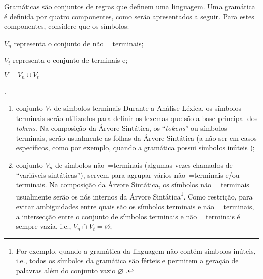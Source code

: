 Gramáticas são conjuntos de regras que definem uma linguagem.
Uma gramática é definida por quatro componentes,
como serão apresentados a seguir.
Para estes componentes,
considere que os símbolos:
\begin{inparaenum}[1)]
\item $V_n$ representa o conjunto de não~=terminais;
\item $V_t$ representa o conjunto de terminais e;
\item $V = V_n \cup V_t$
\end{inparaenum}.
\begin{enumerate}%
    \item {} conjunto $V_t$ de símbolos terminais%
    Durante a Análise Léxica,
    os símbolos terminais serão utilizados para definir os lexemas que são a base principal dos \textit{tokens}.
    Na composição da Árvore Sintática,
    os ``\textit{tokens}'' ou símbolos terminais,
    serão usualmente as folhas da Árvore Sintática (a não ser em casos específicos,
    como por exemplo,
    quando a gramática possui símbolos inúteis \cite{hopcroftBook});

    \item {} conjunto $V_n$ de símbolos não~=terminais (algumas vezes chamados de ``variáveis sintáticas''),
    servem para agrupar vários não~=terminais e\slash{}ou terminais.
    Na composição da Árvore Sintática,
    os símbolos não~=terminais usualmente serão os nós internos da Árvore Sintática\footnote{
    Por exemplo,
    quando a gramática da linguagem não contém símbolos inúteis,
    i.e.,
    todos os símbolos da gramática são férteis e
    permitem a geração de palavras além do conjunto vazio $\varnothing$ \cite{hopcroftBook}.
    }.
    Como restrição,
    para evitar ambiguidades entre quais são os símbolos terminais e
    não~=terminais,
    a intersecção entre o conjunto de símbolos terminais e
    não~=terminais é sempre vazia,
    i.e.,
    $V_n \cap V_t = \varnothing$;


\end{enumerate}
